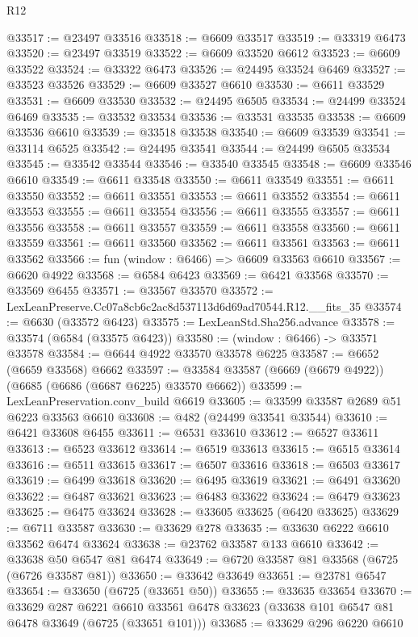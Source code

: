 \begin{lexlean}{R12}
\begin{coremodule}
@33517 := @23497 @33516
@33518 := @6609 @33517
@33519 := @33319 @6473
@33520 := @23497 @33519
@33522 := @6609 @33520 @6612
@33523 := @6609 @33522
@33524 := @33322 @6473
@33526 := @24495 @33524 @6469
@33527 := @33523 @33526
@33529 := @6609 @33527 @6610
@33530 := @6611 @33529
@33531 := @6609 @33530
@33532 := @24495 @6505
@33534 := @24499 @33524 @6469
@33535 := @33532 @33534
@33536 := @33531 @33535
@33538 := @6609 @33536 @6610
@33539 := @33518 @33538
@33540 := @6609 @33539
@33541 := @33114 @6525
@33542 := @24495 @33541
@33544 := @24499 @6505 @33534
@33545 := @33542 @33544
@33546 := @33540 @33545
@33548 := @6609 @33546 @6610
@33549 := @6611 @33548
@33550 := @6611 @33549
@33551 := @6611 @33550
@33552 := @6611 @33551
@33553 := @6611 @33552
@33554 := @6611 @33553
@33555 := @6611 @33554
@33556 := @6611 @33555
@33557 := @6611 @33556
@33558 := @6611 @33557
@33559 := @6611 @33558
@33560 := @6611 @33559
@33561 := @6611 @33560
@33562 := @6611 @33561
@33563 := @6611 @33562
@33566 := fun (window : @6466) => @6609 @33563 @6610
@33567 := @6620 @4922
@33568 := @6584 @6423
@33569 := @6421 @33568
@33570 := @33569 @6455
@33571 := @33567 @33570
@33572 := LexLeanPreserve.Cc07a8cb6c2ac8d537113d6d69ad70544.R12.__fits_35
@33574 := @6630 (@33572 @6423)
@33575 := LexLeanStd.Sha256.advance
@33578 := @33574 (@6584 (@33575 @6423))
@33580 := (window : @6466) -> @33571 @33578
@33584 := @6644 @4922 @33570 @33578 @6225
@33587 := @6652 (@6659 @33568) @6662
@33597 := @33584 @33587 (@6669 (@6679 @4922)) (@6685 (@6686 (@6687 @6225) @33570 @6662))
@33599 := LexLeanPreservation.conv_build @6619
@33605 := @33599 @33587 @2689 @51 @6223 @33563 @6610
@33608 := @482 (@24499 @33541 @33544)
@33610 := @6421 @33608 @6455
@33611 := @6531 @33610
@33612 := @6527 @33611
@33613 := @6523 @33612
@33614 := @6519 @33613
@33615 := @6515 @33614
@33616 := @6511 @33615
@33617 := @6507 @33616
@33618 := @6503 @33617
@33619 := @6499 @33618
@33620 := @6495 @33619
@33621 := @6491 @33620
@33622 := @6487 @33621
@33623 := @6483 @33622
@33624 := @6479 @33623
@33625 := @6475 @33624
@33628 := @33605 @33625 (@6420 @33625)
@33629 := @6711 @33587
@33630 := @33629 @278
@33635 := @33630 @6222 @6610 @33562 @6474 @33624
@33638 := @23762 @33587 @133 @6610
@33642 := @33638 @50 @6547 @81 @6474
@33649 := @6720 @33587 @81 @33568 (@6725 (@6726 @33587 @81))
@33650 := @33642 @33649
@33651 := @23781 @6547
@33654 := @33650 (@6725 (@33651 @50))
@33655 := @33635 @33654
@33670 := @33629
    @287
    @6221
    @6610
    @33561
    @6478
    @33623
    (@33638 @101 @6547 @81 @6478 @33649 (@6725 (@33651 @101)))
@33685 := @33629
    @296
    @6220
    @6610

\end{coremodule}
\end{lexlean}

